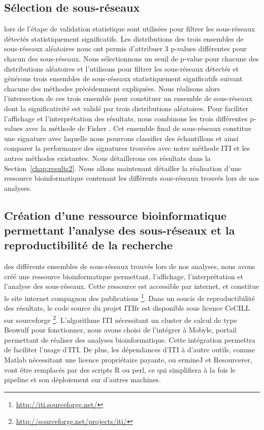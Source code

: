		\subsection{\textcolor{green!45!black}{Sélection de sous-réseaux}}\label{sub:Selection}
			 lors de l'étape de validation statistique sont utilisées pour filtrer les sous-réseaux détectés statistiquement significatifs.
			Les distributions des trois ensembles de sous-réseaux aléatoires nous ont permis d'attribuer 3 p-values différentes pour chacun des sous-réseaux.
			Nous sélectionnons un seuil de p-value pour chacune des distributions aléatoires et l'utilisons pour filtrer les sous-réseaux détectés et générons trois ensembles de sous-réseaux statistiquement significatifs suivant chacune des méthodes précédemment expliquées.
			Nous réalisons alors l'intersection de ces trois ensemble pour constituer un ensemble de sous-réseaux dont la significativité est validé par trois distributions aléatoires.
			Pour faciliter l'affichage et l'interprétation des résultats, nous combinons les trois différentes p-values avec la méthode de Fisher \citep{Fisher1925}.
			Cet ensemble final de sous-réseaux constitue une signature avec laquelle nous pourrons classifier des échantillons et ainsi comparer la performance des signatures trouvées avec notre méthode ITI et les autres méthodes existantes.
			Nous détaillerons ces résultats dans la Section~\ref{chap:results2}.
			Nous allons maintenant détailler la réalisation d'une ressource bioinformatique contenant les différents sous-réseaux trouvés lors de nos analyses.

		\subsection{\textcolor{green!45!black}{Création d'une ressource bioinformatique permettant l'analyse des sous-réseaux et la reproductibilité de la recherche}}\label{sec:Ressource}
			 des différents ensembles de sous-réseaux trouvés lors de nos analyses, nous avons créé une ressource bioinformatique permettant, l'affichage, l'interprétation et l'analyse des sous-réseaux.
			Cette ressource est accessible par internet, et constitue le site internet compagnon des publications \footnote{\url{http://iti.sourceforge.net/}}.
			Dans un soucis de reproductibilité des résultats, le code source du projet \ac{ITIfr} est disponible sous licence CeCILL sur sourceforge \footnote{\url{http://sourceforge.net/projects/iti/}}.
			L'algorithme ITI nécessitant un cluster de calcul de type Beowulf pour fonctionner, nous avons choisi de l'intégrer à Mobyle, portail permettant de réaliser des analyses bioinformatique.
			Cette intégration permettra de faciliter l'usage d'ITI.
			De plus, les dépendances d'ITI à d'autre outils, comme Matlab nécessitant une licence propriétaire payante, ou ermineJ et Resourcerer, vont être remplacés par des scripts R ou perl, ce qui simplifiera à la fois le pipeline et son déploiement sur d'autres machines.

